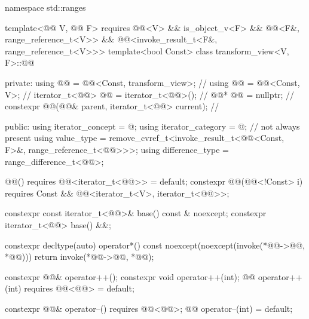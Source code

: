 %
\begin{codeblock}
namespace std::ranges {
  template<@@ V, @@ F>
    requires @@<V> && is_object_v<F> &&
             @@<F&, range_reference_t<V>> &&
             @@<invoke_result_t<F&, range_reference_t<V>>>
  template<bool Const>
  class transform_view<V, F>::@@ {
  private:
    using @@ = @@<Const, transform_view>;                  // \expos
    using @@ = @@<Const, V>;                                 // \expos
    iterator_t<@@> @@ = iterator_t<@@>();                     // \expos
    @@* @@ = nullptr;                                          // \expos
    constexpr @@(@@& parent, iterator_t<@@> current);       // \expos

  public:
    using iterator_concept  = @\seebelownc@;
    using iterator_category = @\seebelownc@;                        // not always present
    using value_type        =
      remove_cvref_t<invoke_result_t<@@<Const, F>&, range_reference_t<@@>>>;
    using difference_type   = range_difference_t<@@>;

    @@() requires @@<iterator_t<@@>> = default;
    constexpr @@(@@<!Const> i)
      requires Const && @@<iterator_t<V>, iterator_t<@@>>;

    constexpr const iterator_t<@@>& base() const & noexcept;
    constexpr iterator_t<@@> base() &&;

    constexpr decltype(auto) operator*() const
      noexcept(noexcept(invoke(*@@->@@, *@@))) {
      return invoke(*@@->@@, *@@);
    }

    constexpr @@& operator++();
    constexpr void operator++(int);
    @@ operator++(int) requires @@<@@> = default;

    constexpr @@& operator--() requires @@<@@>;
    @@ operator--(int) = default;

}}
\end{codeblock}
